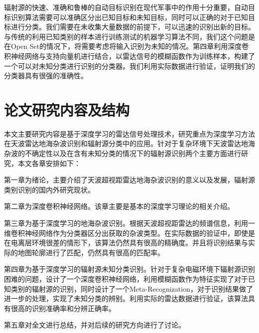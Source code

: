 辐射源的快速、准确和鲁棒的自动目标识别在现代军事中的作用十分重要，自动目标识别算法需要可以准确区分出已知目标和未知目标，同时可以正确的对于已知目标进行分类。我们需要在未收集大量数据的前提下，可以迅速的识别出新的目标。与传统的利用已知类别的样本进行训练测试的机器学习算法不同，我们这个问题是在Open Set的情况下，将需要考虑将输入识别为未知的情况。第四章利用深度卷积神经网络与支持向量机进行结合，以雷达信号的模糊函数作为训练样本，构建了一个可以对未知分类进行识别的分类器。我们利用实际数据进行验证，证明我们的分类器具有很强的准确性。

\section{论文研究内容及结构}

本文主要研究内容是基于深度学习的雷达信号处理技术，研究重点为深度学习方法在天波雷达地海杂波识别和辐射源分类中的应用。针对于复杂环境下天波雷达地海杂波的不确定性以及在含有未知分类的情况下的辐射源识别两个主要方面进行研究，本文各章安排如下：

第一章为绪论，主要介绍了天波超视距雷达地海杂波识别的意义以及发展，辐射源类别识别的国内外研究现状。

第二章为深度卷积神经网络。该章主要是基本的深度学习理论的相关介绍。

第三章为基于深度学习的地海杂波识别。根据天波超视距雷达的频谱信息，利用一维卷积神经网络作为分类器区分出获取的杂波类型。在实际数据的验证中，即使是在电离层环境很差的情形下，该算法仍然具有很高的精确度。并且将识别结果与实际的地图轮廓进行了匹配，仍然具有很高的匹配率。

第四章为基于深度学习的辐射源未知分类识别。针对于复杂电磁环境下辐射源识别困难的问题，设计了一个深度卷积神经网络，利用模糊函数作为特征实现了对于已知类别的辐射源的识别，同时设计了一个Meta-Recognization，对于识别结果做了进一步的处理，实现了未知分类的辨别。利用实际的雷达数据进行验证，该算法具有很高的识别准确率和分辨正确率。

第五章对全文进行总结，并对后续的研究方向进行了讨论。